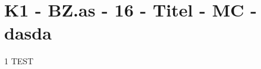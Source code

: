 \section{K1 - BZ.as - 16 - Titel - MC - dasda}

\begin{langesbeispiel} \item[1] %
TEST
\end{langesbeispiel}